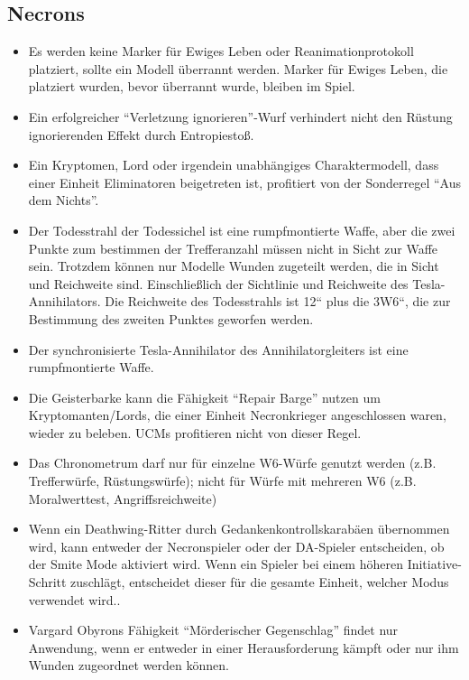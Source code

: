 \subsection{Necrons}

\begin{itemize}

 \item Es werden keine Marker für Ewiges Leben oder Reanimationprotokoll
  platziert, sollte ein Modell überrannt werden. Marker für Ewiges Leben, die
  platziert wurden, bevor überrannt wurde, bleiben im Spiel.

 \item Ein erfolgreicher ``Verletzung ignorieren''-Wurf verhindert nicht den
  Rüstung ignorierenden Effekt durch Entropiestoß.

 \item Ein Kryptomen, Lord oder irgendein unabhängiges Charaktermodell, dass
  einer Einheit Eliminatoren beigetreten ist, profitiert von der Sonderregel
  ``Aus dem Nichts''.

 \item Der Todesstrahl der Todessichel ist eine rumpfmontierte Waffe, aber die
  zwei Punkte zum bestimmen der Trefferanzahl müssen nicht in Sicht zur Waffe
  sein.  Trotzdem können nur Modelle Wunden zugeteilt werden, die in Sicht und
  Reichweite sind. Einschließlich der Sichtlinie und Reichweite des
  Tesla-Annihilators.  Die Reichweite des Todesstrahls ist 12“ plus die 3W6“,
  die zur Bestimmung des zweiten Punktes geworfen werden.

 \item Der synchronisierte Tesla-Annihilator des Annihilatorgleiters ist eine
  rumpfmontierte Waffe.

 \item Die Geisterbarke kann die Fähigkeit ``Repair Barge'' nutzen um
  Kryptomanten/Lords, die einer Einheit Necronkrieger angeschlossen waren,
  wieder zu beleben. UCMs profitieren nicht von dieser Regel.

 \item Das Chronometrum darf nur für einzelne W6-Würfe genutzt werden (z.B.
  Trefferwürfe, Rüstungswürfe); nicht für Würfe mit mehreren W6 (z.B.
  Moralwerttest, Angriffsreichweite)

 \item Wenn ein Deathwing-Ritter durch Gedankenkontrollskarabäen übernommen
  wird, kann entweder der Necronspieler oder der DA-Spieler entscheiden, ob der
  Smite Mode aktiviert wird. Wenn ein Spieler bei einem höheren
  Initiative-Schritt zuschlägt, entscheidet dieser für die gesamte Einheit,
  welcher Modus verwendet wird..

 \item Vargard Obyrons Fähigkeit ``Mörderischer Gegenschlag'' findet nur
  Anwendung, wenn er entweder in einer Herausforderung kämpft oder nur ihm
  Wunden zugeordnet werden können.

\end{itemize}

